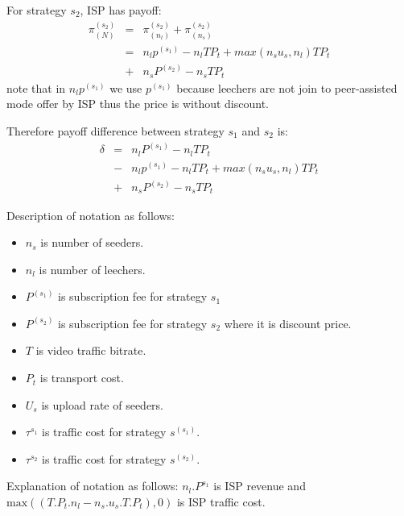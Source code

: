 \documentclass[paper]{ieice}
\begin{document}
For strategy $s_2$, ISP has payoff:
\begin{eqnarray}
	\pi^{(s_2)}_{(N)} &=& \pi^{(s_2)}_{(n_l)} + \pi^{(s_2)}_{(n_s)}\\
	&=&n_l p^{(s_1)} - n_lTP_t + max (n_s u_s,n_l)T P_t\\
	&+&n_s P^{(s_2)} - n_s T P_t
\end{eqnarray}
note that in $n_l p^{(s_1)}$ we use $p^{(s_1)}$ because leechers are not join to peer-assisted mode offer by ISP thus the price is without discount.

Therefore payoff difference between strategy $s_1$ and $s_2$ is:
\begin{eqnarray}
	\delta &=& n_l P^{(s_1)} - n_l T P_t \\
	&-& n_l p^{(s_1)} - n_lTP_t + max (n_s u_s,n_l)T P_t \\
	&+& n_s P^{(s_2)} - n_s T P_t
\end{eqnarray}

Description of notation as follows:
\begin{itemize}
	\item $n_s$ is number of seeders.
	\item $n_l$ is number of leechers.
	\item $P^{(s_1)}$ is subscription fee for strategy $s_1$
	\item $P^{(s_2)}$ is subscription fee for strategy $s_2$ where it is discount price.
	\item $T$ is video traffic bitrate. 
	\item $P_t$ is transport cost. 
	\item $U_s$ is upload rate of seeders.
	\item $\tau^{s_1}$ is traffic cost for strategy $s^{(s_1)}$.
	\item $\tau^{s_2}$ is traffic cost for strategy $s^{(s_2)}$.
\end{itemize}
Explanation of notation as follows:
$n_l . P^{s_1}$ is ISP revenue and $\text{max}((T.P_t.n_l - n_s . u_s .T .P_t),0)$ is ISP traffic cost.
\end{document}
